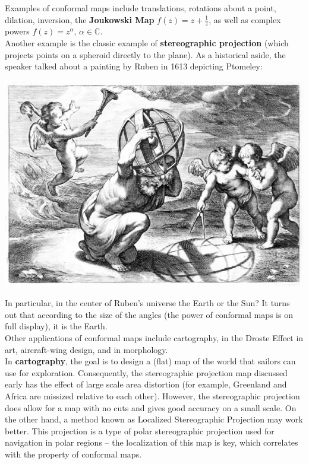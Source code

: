 \documentclass[12pt]{amsart}
\begin{document}
\vspace{0.25cm}
Examples of conformal maps include translations, rotations about a point, dilation, inversion, the \textbf{Joukowski Map} $f(z) = z + \frac{1}{z}$, as well as complex powers $f(z) = z^\alpha, \, \alpha \in \mathbb{C}.$ \\

Another example is the classic example of \textbf{stereographic projection} (which projects points on a spheroid directly to the plane). As a historical aside, the speaker talked about a painting by Ruben in 1613 depicting Ptomeley: \\

\begin{center}
\includegraphics[scale = 0.35]{note_imgs/ruben_ptolemy.png}
\end{center}

In particular, in the center of Ruben's universe the Earth or the Sun? It turns out that according to the size of the angles (the power of conformal maps is on full display), it is the Earth. \\ 

Other applications of conformal maps include cartography, in the Droste Effect in art, aircraft-wing design, and in morphology. \\

In \textbf{cartography}, the goal is to design a (flat) map of the world that sailors can use for exploration. 
Consequently, the stereographic projection map discussed early has the effect of large scale area distortion (for example, Greenland and Africa are missized relative to each other). However, the stereographic projection does allow for a map with no cuts and gives good accuracy on a small scale. 
On the other hand, a method known as Localized Stereographic Projection may work better. This projection is a type of polar stereographic projection used for navigation in polar regions -- the localization of this map is key, which correlates with the property of conformal maps. \\
\end{document}
